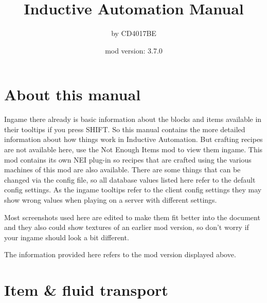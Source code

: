 \documentclass[11pt]{article} %
\title{Inductive Automation Manual}
\author{by CD4017BE}
\date{mod version: 3.7.0}
\begin{document}
 \maketitle
 \tableofcontents
 
 \section{About this manual}  
  Ingame there already is basic information about the blocks and items available in their tooltips if you press SHIFT. So this manual contains the more detailed information about how things work in Inductive Automation. But crafting recipes are not available here, use the Not Enough Items mod to view them ingame. This mod contains its own NEI plug-in so recipes that are crafted using the various machines of this mod are also available. There are some things that can be changed via the config file, so all database values listed here refer to the default config settings. As the ingame tooltips refer to the client config settings they may show wrong values when playing on a server with different settings.

Most screenshots used here are edited to make them fit better into the document and they also could show textures of an earlier mod version, so don't worry if your ingame should look a bit different. 

The information provided here refers to the mod version displayed above.

\newpage
\section{Item \& fluid transport}
\end{document}
